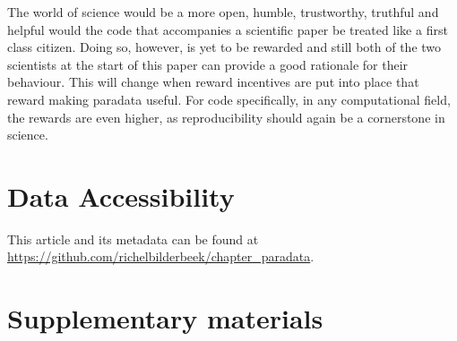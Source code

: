 
The world of science would be a more open, humble, trustworthy, truthful
and helpful would the code that accompanies a scientific paper
be treated like a first class citizen. 
Doing so, however, is yet to be rewarded
and still both of the two scientists at the start of this paper 
can provide a good rationale for their behaviour.
This will change when reward incentives are put into place 
that reward making paradata useful.
For code specifically, in any computational field,
the rewards are even higher, as reproducibility should again be 
a cornerstone in science.

\section{Data Accessibility}

This article and its metadata can be found at 
\url{https://github.com/richelbilderbeek/chapter_paradata}.




\iffalse

\newpage
\appendix
\section{Supplementary materials}

\renewcommand{\thefigure}{S\arabic{figure}}
\setcounter{figure}{0}

\renewcommand{\thetable}{S\arabic{table}}
\setcounter{table}{0}


